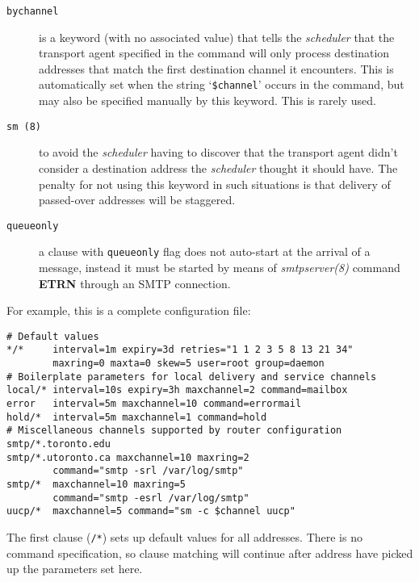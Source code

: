 \begin{description}
\item[{\tt bychannel}] \mbox{}

is a keyword (with no associated value) that tells 
the {\em scheduler\/} that the transport agent specified in the command will 
only process destination addresses that match the first destination channel it 
encounters. This is automatically set when the string `{\tt \$channel}' 
occurs in the command, but may also be specified manually by this keyword. 
This is rarely used.



\item[{\tt sm (8)}] \mbox{}

to avoid the {\em scheduler\/} having to discover that 
the transport agent didn't consider a destination address the {\em scheduler\/}
thought it should have. The penalty for not using this keyword in such situations 
is that delivery of passed-over addresses will be staggered.



\item[{\tt queueonly}] \mbox{}

a clause with {\tt queueonly} flag does not auto-start 
at the arrival of a message, instead it must be started by means of 
{\em smtpserver(8)\/} command {\bf ETRN} through an SMTP connection.



\end{description}


For example, this is a complete configuration file:
\begin{verbatim}
# Default values
*/*     interval=1m expiry=3d retries="1 1 2 3 5 8 13 21 34"
        maxring=0 maxta=0 skew=5 user=root group=daemon
# Boilerplate parameters for local delivery and service channels
local/* interval=10s expiry=3h maxchannel=2 command=mailbox
error   interval=5m maxchannel=10 command=errormail
hold/*  interval=5m maxchannel=1 command=hold
# Miscellaneous channels supported by router configuration
smtp/*.toronto.edu
smtp/*.utoronto.ca maxchannel=10 maxring=2
        command="smtp -srl /var/log/smtp"
smtp/*  maxchannel=10 maxring=5
        command="smtp -esrl /var/log/smtp"
uucp/*  maxchannel=5 command="sm -c $channel uucp"
\end{verbatim}

The first clause ({\tt */*}) sets up default values for all
addresses. There is no command specification, so clause matching
will continue after address have picked up the parameters set here. 

